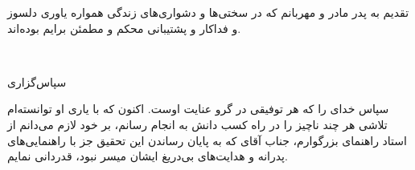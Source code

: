 %
% 
%
%
\newpage
\thispagestyle{empty}
\begin{center} \Large 
{\vskip-0.1cm{\nastaliq  تقدیم به پدر مادر و مهربانم که در سختی‌ها و دشواری‌های زندگی همواره یاوری دلسوز و فداکار و پشتیبانی محکم و مطمئن برایم بوده‌اند. }}
\end{center} 
\vfill

\mbox{ }

\newpage
\thispagestyle{empty}
{\nastaliq سپاس‌گزاری}\\
 \vspace{.5cm}
 
 سپاس خدای را که هر توفيقی در گرو عنايت اوست. اکنون که با ياری او توانسته‌ام تلاشی هر چند ناچيز را در راه کسب دانش به انجام رسانم، بر خود لازم می‌دانم از استاد راهنمای بزرگوارم، جناب آقای 
{\fasupervisor} 
که به پايان رساندن اين تحقيق جز با راهنمايی‌های پدرانه و هدايت‌های بی‌دريغ ايشان ميسر نبود، قدردانی نمايم.
    
\vspace{1cm}
   
\hspace{6cm}{ امیدوارم بتوانم از عهده ادای حق این عزیزان برآیم.}
   
\hspace{9cm}
\fadate
\vfill

\mbox{ }